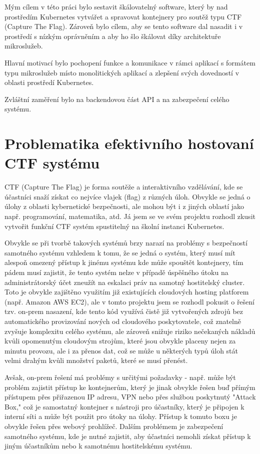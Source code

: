 \documentclass[12pt, a4paper,
oneside,      %
openright
]{report}
\begin{document}
Mým cílem v této práci bylo sestavit škálovatelný software, který by nad prostředím Kubernetes vytvářet a spravovat kontejnery pro soutěž typu CTF (Capture The Flag). Zároveň bylo cílem, aby se tento software dal nasadit i v prostředí s nízkým oprávněním a aby ho šlo škálovat díky architektuře mikroslužeb.

Hlavní motivací bylo pochopení funkce a komunikace v rámci aplikací s formátem typu mikroslužeb místo monolitických aplikací a zlepšení svých dovedností v oblasti prostředí Kubernetes.

Zvláštní zaměření bylo na backendovou část API a na zabezpečení celého systému.

\chapter{Problematika efektivního hostovaní CTF systému}
CTF (Capture The Flag) je forma soutěže a interaktivního vzdělávání, kde se účastníci snaží získat co nejvíce vlajek (flag) z různých úloh. Obvykle se jedná o úlohy z oblasti kybernetické bezpečnosti, ale mohou být i z jiných oblastí jako např. programování, matematika, atd. Já jsem se ve svém projektu rozhodl zkusit vytvořit funkční CTF systém spustitelný na školní instanci Kubernetes. 

Obvykle se při tvorbě takových systémů brzy narazí na problémy s bezpečností samotného systému vzhledem k tomu, že se jedná o systém, který musí mít alespoň omezený přístup k jinému systému kde může spouštět kontejnery, tím pádem musí zajistit, že tento systém nelze v případě úspěšného útoku na administrátorský účet zneužít na eskalaci práv na samotný hostitelský cluster. Toto je obvykle zajištěno využitím již existujících cloudových hosting platforem (např. Amazon AWS EC2), ale v tomto projektu jsem se rozhodl pokusit o řešení tzv. on-prem nasazení, kde tento kód využívá čistě již vytvořených zdrojů bez automatického provizování nových od cloudového poskytovatele, což znatelně zvyšuje komplexitu celého systému, ale zároveň snižuje riziko nečekaných nákladů kvůli opomenutým cloudovým strojům, které jsou obvykle placeny nejen za minutu provozu, ale i za přenos dat, což se může u některých typů úloh stát velmi drahým kvůli množství paketů, které se musí přenést. 

Avšak, on-prem řešení má problémy s určitými požadavky - např. může být problém zajistit přístup ke kontejnerům, který je jinak obvykle řešen buď přímým přístupem přes přiřazenou IP adresu, VPN nebo přes službou poskytnutý "Attack Box," což je samostatný kontejner s nástroji pro účastníky, který je připojen k interní síti a může být použit pro útoky na úlohy. Přístup k tomuto boxu je obvykle řešen přes webový prohlížeč. Dalším problémem je zabezpečení samotného systému, kde je nutné zajistit, aby účastníci nemohli získat přístup k jiným účastníkům nebo k samotnému hostitelskému systému. 
\end{document}
